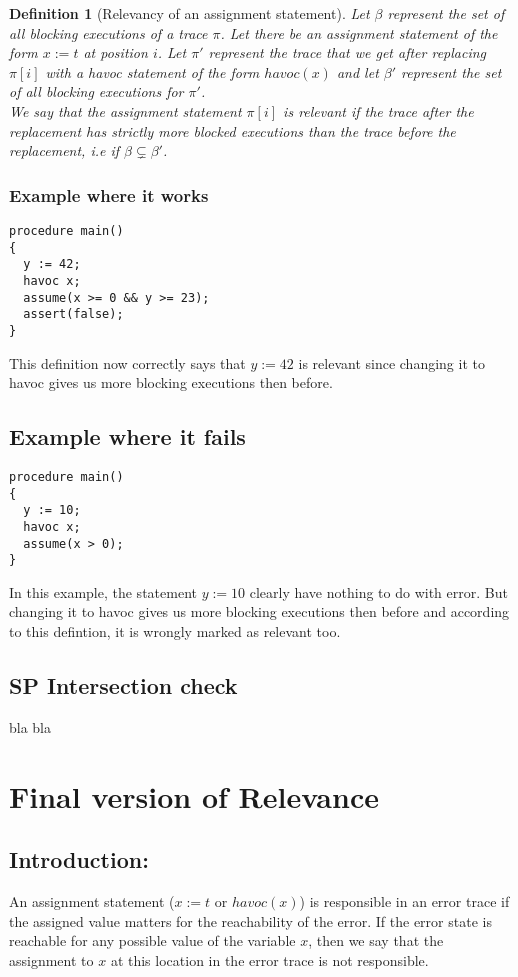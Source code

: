 \documentclass{article}
\newtheorem{mydef}{Definition}
\begin{document}
\begin{mydef}[Relevancy of an assignment statement]\label{mydef:relevancy_definition}
Let $\beta$ represent the set of all blocking executions of a trace $\pi$. Let there be an assignment statement of the form $x:=t$ at position $i$. Let $\pi'$ represent the trace that we get after replacing $\pi[i]$ with a havoc statement of the form $havoc(x)$ and let $\beta'$ represent the set of all blocking executions for $\pi'$.\\
We say that the assignment statement $\pi[i]$ is relevant if the trace after the replacement has strictly more blocked executions than the trace before the replacement, i.e if $\beta \subsetneq \beta'$. 
\end{mydef}
\subsubsection{Example where it works}
\begin{lstlisting}
procedure main()
{
  y := 42;
  havoc x;
  assume(x >= 0 && y >= 23);
  assert(false);
}
\end{lstlisting}
This definition now correctly says that $y:=42$ is relevant since changing it to havoc gives us more blocking executions then before.
\subsection{Example where it fails}
\begin{lstlisting}
procedure main()
{
  y := 10;
  havoc x;
  assume(x > 0);
}
\end{lstlisting}
In this example, the statement $y:=10$ clearly have nothing to do with error. But changing it to havoc gives us more blocking executions then before and according to this defintion, it is wrongly marked as relevant too. 

\subsection{SP Intersection check}
bla bla

\section{Final version of Relevance}
\subsection{Introduction:}
An assignment statement ($x := t$ or $havoc(x)$) is responsible in an error trace if the assigned value matters for the reachability of the error. If the error state is reachable for any possible value of the variable $x$, then we say that the assignment to $x$ at this location in the error trace is not responsible.
\end{document}
